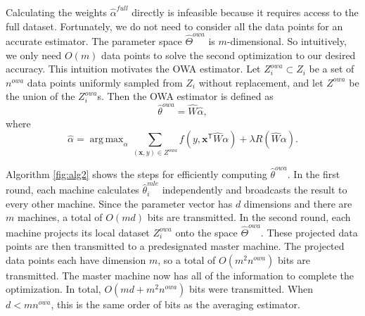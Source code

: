 \documentclass[twoside]{article}
\DeclareMathOperator*{\argmax}{arg\,max}
\newcommand{\Zproj}{Z^{\textit{proj}}}
\newcommand{\Zowa}{Z^{\textit{owa}}}
\newcommand{\nowa}{n^{\textit{owa}}}
\newcommand{\matW}{\hat W}
\newcommand{\W}{{\hat \Theta^{\textit{owa}}}}
\newcommand{\x}{\mathbf{x}}
\newcommand{\w}{\theta}
\newcommand{\ahat}{\hat\alpha}
\newcommand{\afull}{\ahat^{\textit{full}}}
\newcommand{\wowa}{\hat\w^{owa}}
\newcommand{\wmle}{\hat\w^{mle}}
\newcommand{\trans}[1]{\ensuremath{{#1}^{\mathsf{T}}}}
\begin{document}
Calculating the weights $\afull$ directly is infeasible because it requires access to the full dataset.
Fortunately, we do not need to consider all the data points for an accurate estimator.
The parameter space $\W$ is $m$-dimensional.
So intuitively, we only need $O(m)$ data points to solve the second optimization to our desired accuracy.
This intuition motivates the OWA estimator.
Let $\Zowa_i\subset Z_i$ be a set of $\nowa$ data points uniformly sampled from $Z_i$ without replacement,
and let $\Zowa$ be the union of the $\Zowa_i$s.
Then the OWA estimator is defined as
\begin{equation}
\wowa = \matW \ahat,
\end{equation}
where
\begin{equation}
\label{eq:ahat}
\ahat = \argmax_\alpha \sum _{(\x,y)\in \Zowa} f\left(y,\trans\x \matW \alpha \right)
+ \lambda R (\matW\alpha)
.
\end{equation}

Algorithm \ref{fig:alg2} shows the steps for efficiently computing $\wowa$.
In the first round, each machine calculates $\wmle_i$ independently and broadcasts the result to every other machine.
Since the parameter vector has $d$ dimensions and there are $m$ machines, a total of $O(md)$ bits are transmitted.
In the second round, each machine projects its local dataset $\Zowa_i$ onto the space $\W$.
These projected data points are then transmitted to a predesignated master machine.
The projected data points each have dimension $m$, so a total of $O(m^2\nowa)$ bits are transmitted.
The master machine now has all of the information to complete the optimization.
In total, $O(md + m^2\nowa)$ bits were transmitted.
When $d<m\nowa$, this is the same order of bits as the averaging estimator.

\end{document}
